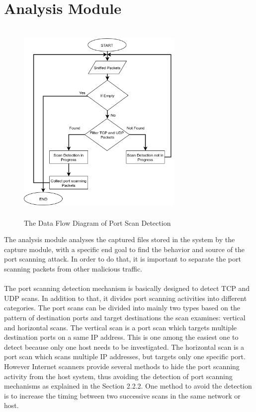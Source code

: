 \section{Analysis Module}
\begin{figure}[t]
\centering
\includegraphics[width=8cm, height=10cm]{images/analysis_flow.png}
\caption{ The Data Flow Diagram of Port Scan Detection}
\end{figure}
The analysis module analyses the captured files stored in the system by the capture module, with a specific end goal to find the behavior and source of the  port scanning attack.
In order to do that, it is important to separate the port scanning packets from other malicious traffic.\\\\
The port scanning detection mechanism is basically designed  to detect TCP and UDP scans.
In addition to that, it divides port scanning activities into different categories.
The port scans can be divided into mainly two types based on the pattern of 
destination ports and target destinations the scan examines: vertical and horizontal scans.
The vertical scan is a port scan which targets multiple destination ports on a same IP address.
This is one among the easiest one to detect because only one host needs to be investigated. 
The horizontal scan is a port scan which scans multiple IP addresses, but targets only one specific port.
However Internet scanners provide several methods to hide the port scanning activity from the host system, thus avoiding the detection of port scanning mechanisms as explained in the Section 2.2.2.
One method to avoid the detection is to increase the timing between two successive scans in the same network or host.
